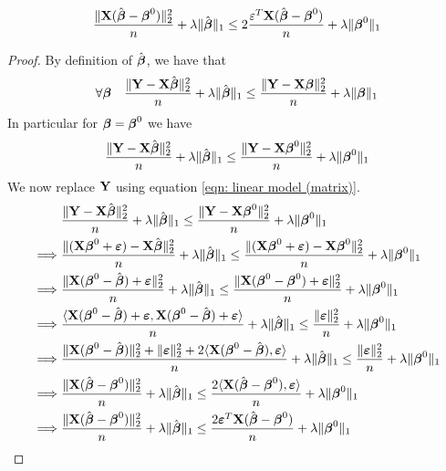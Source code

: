\begin{lemma}
    $$\frac{\| \X (\hat{\bta}-\bta^{0})\|_{2}^{2}}{n} + \lambda\|\hat{\bta}\|_{1} \leq 2 \frac{\varepsilon^{T} \X (\hat{\bta}-\bta^{0})}{n}+\lambda\|\bta^{0}\|_{1}$$
\end{lemma}
\begin{proof}
    By definition of $\hat \bta$, we have that
    $$
        \forall \bta \quad \frac{\| \Y-\X \hat \bta \|_{2}^{2}}{n} + \lambda \| \hat \bta \|_{1} \leq \frac{\|\Y-\X \bta \|_{2}^{2}}{n}+\lambda \| \bta \|_{1}
    $$
    In particular for $\bta = \bta^0$ we have
    $$
        \frac{\| \Y-\X \hat \bta \|_{2}^{2}}{n}+\lambda\| \hat \bta \|_{1} \leq \frac{ \| \Y-\X \bta^0\|_{2}^{2}}{n}+\lambda \| \bta^0\|_{1}
    $$
    We now replace $\Y$ using equation \eqref{eqn: linear model (matrix)}.
    \begin{align*}
                 & \frac{\|\Y  - \X \hat{\bta} \|_{2}^{2}}{n} + \lambda \| \hat{\bta}\|_{1} \leq \frac{\| \Y  - \X \bta^0 \|_2^2}{n}+\lambda\|\bta^{0}\|_{1}                                                     \\
        \implies &
        \frac{\| (\X \bta^0 + \eps) - \X \hat \bta \|_{2}^{2}}{n}+\lambda\| \hat \bta \|_{1} \leq \frac{ \| (\X \bta^0 + \eps)-\X \bta^0\|_{2}^{2}}{n}+\lambda \| \bta^0\|_{1}                                   \\
        \implies &
        \frac{\| \X ( \bta^0 - \hat \bta) + \eps \|_{2}^{2}}{n} + \lambda\| \hat \bta \|_{1} \leq \frac{ \| \X ( \bta^0 - \bta^0) + \eps \|_{2}^{2}}{n}+\lambda \| \bta^0\|_{1}                                  \\
        \implies &
        \frac{\langle \X ( \bta^0 - \hat \bta) + \eps, \X ( \bta^0 - \hat \bta) + \eps \rangle}{n}+\lambda \| \hat \bta \|_{1} \leq \frac{ \| \eps \|_{2}^{2}}{n}+\lambda \| \bta^0\|_{1}                        \\
        \implies &
        \frac{\| \X (\bta^0 - \hat \bta) \| _2^2 + \| \eps \|_2^2 + 2 \langle \X ( \bta^0 - \hat \bta),  \eps \rangle}{n}+\lambda \| \hat \bta \|_{1} \leq \frac{ \| \eps \|_{2}^{2}}{n}+\lambda \| \bta^0\|_{1} \\
        \implies &
        \frac{\| \X (\hat \bta - \bta^0) \| _2^2}{n} + \lambda \| \hat \bta \|_{1} \leq \frac{2 \langle \X ( \hat \bta - \bta^0),  \eps \rangle}{n} + \lambda \| \bta^0\|_{1}                                    \\
        \implies &
        \frac{\| \X (\hat \bta - \bta^0) \| _2^2}{n} + \lambda \| \hat \bta \|_{1} \leq \frac{2 \eps^T \X ( \hat \bta - \bta^0)}{n} + \lambda \| \bta^0\|_{1}                                                    \\
    \end{align*}
\end{proof}


